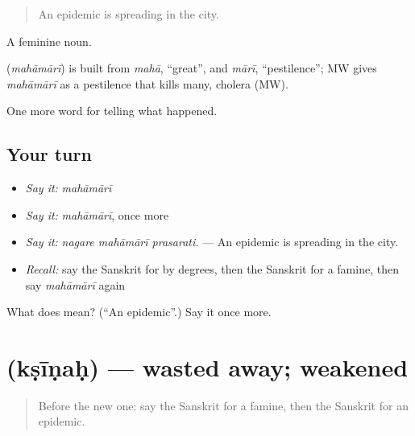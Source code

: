 \begin{quote}
An epidemic is spreading in the city.
\end{quote}

A feminine noun.

\begin{cousinweb}
\textbf{} (\emph{mahāmārī}) is built from \emph{mahā}, \textquotedblleft{}great\textquotedblright{}, and \emph{mārī}, \textquotedblleft{}pestilence\textquotedblright{}; MW gives \emph{mahāmārī} as a pestilence that kills many, cholera (MW).
\end{cousinweb}

\begin{grammarlens}[title={What you've built}]
One more word for telling what happened.
\end{grammarlens}

\subsection*{Your turn}
\begin{itemize}
\raggedright
  \item \emph{Say it:} \emph{mahāmārī}
  \item \emph{Say it:} \emph{mahāmārī}, once more
  \item \emph{Say it:} \emph{nagare mahāmārī prasarati.} — An epidemic is spreading in the city.
  \item \emph{Recall:} say the Sanskrit for by degrees, then the Sanskrit for a famine, then say \emph{mahāmārī} again
\end{itemize}

\begin{tcolorbox}[breakable,colback=teal!4,colframe=teal!35!black,title={Before you move on}]
What does  mean? (\textquotedblleft{}An epidemic\textquotedblright{}.) Say it once more.
\end{tcolorbox}
\section[\texorpdfstring{\sk{क्षीणः} (kṣīṇaḥ)}{क्षीणः (kṣīṇaḥ)}]{ (kṣīṇaḥ) — wasted away; weakened}

\label{lesson:SA-C303-ksinah}



\begin{quote}
Before the new one: say the Sanskrit for a famine, then the Sanskrit for an epidemic.
\end{quote}

